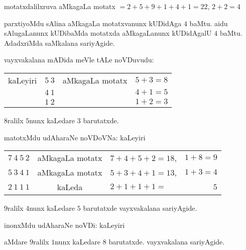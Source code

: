\smallskip

\smallskip

motatxdalilxruva aMkagaLa motatx $=2+5+9+1+4+1=22$, $2+2=4$

parxtiyoMdu sAlina aMkagaLa motatxvanunx kUDidAga $4$ baMtu. aidu sAlugaLanunx kUDibaMda motatxda aMkagaLanunx kUDidAgalU $4$ baMtu. AdadxriMda saMkalana sariyAgide.

vayxvakalana mADida meVle tALe noVDuvudu:

\smallskip

\begin{tabular}{lcll}
kaLeyiri & $5~3$ & aMkagaLa motatx & $5+3=8$\\
& $4~1$ & & $4+1=5$\\\cline{2-2}\cline{4-4}
& $1~2$ & & $1+2 =3$
\end{tabular}

\smallskip

$8$ralilx $5$nunx kaLedare $3$ barutatxde. 

matotxMdu udAharaNe noVDoVNa: kaLeyiri

\smallskip

\begin{tabular}{lclr}
$7~4~5~2$ & aMkagaLa motatx & $7+4+5+2=18$, & $1+8=9$ \\
$5~3~4~1$ & aMkagaLa motatx & $5+3+4+1=13$, & $1+3=4$\\\cline{1-1}\cline{3-3}\cline{4-4}
$2~1~1~1$ & kaLeda & $2+1+1+1 =$  & $5$
\end{tabular}

\smallskip

$9$ralilx $4$nunx kaLedare $5$ barutatxde vayxvakalana sariyAgide.

inonxMdu udAharaNe noVDi: kaLeyiri

\smallskip

{\fontsize{10.4}{12}}

\smallskip

aMdare $9$ralilx $1$nunx kaLedare $8$ barutatxde. vayxvakalana sariyAgide.
